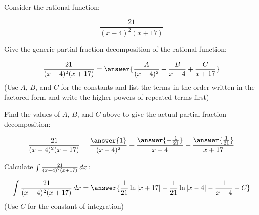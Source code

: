 \documentclass{ximera}
\author{Nicholas Hemleben and Jim Talamo}
\begin{document}
\begin{exercise}


Consider the rational function:

\[ 
\frac{21}{(x-4)^2(x+17)} 
\]

Give the generic partial fraction decomposition of the rational function:

\[
\frac{21}{(x-4)^2(x+17)} =
\answer{\frac{A}{(x-4)^2} + \frac{B}{x-4} + \frac{C}{x+17}}
\]
(Use $A$, $B$, and $C$ for the constants and list the terms in the order written in the factored form and write the higher powers of repeated terms first)

\begin{exercise}
Find the values of $A$, $B$, and $C$ above to give the actual partial fraction decomposition:

\[
\frac{21}{(x-4)^2(x+17)} =
 \frac{\answer{1}}{{(x-4)^2}} + 
\frac{\answer{-\frac{1}{21}}}{{x-4}} +
 \frac{\answer{\frac{1}{21}}}{{x+17}}
\]
\end{exercise}

\begin{exercise}
Calculate $\int \frac{21}{(x-4)^2(x+17)} \mathop{}\!d x $:

\[ 
\int \frac{21}{(x-4)^2(x+17)} \d x = \answer{\frac{1}{21} \ln|x+17|-\frac{1}{21}\ln|x-4|-\frac{1}{x-4}+C}
\]
(Use $C$ for the constant of integration)

\end{exercise}
\end{exercise}
\end{document}
